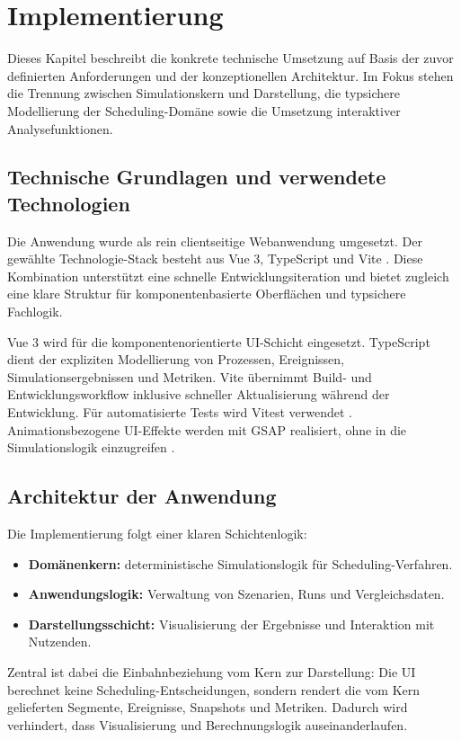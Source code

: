 \chapter{Implementierung}

Dieses Kapitel beschreibt die konkrete technische Umsetzung auf Basis der zuvor definierten Anforderungen und der konzeptionellen Architektur. Im Fokus stehen die Trennung zwischen Simulationskern und Darstellung, die typsichere Modellierung der Scheduling-Domäne sowie die Umsetzung interaktiver Analysefunktionen.

\section{Technische Grundlagen und verwendete Technologien}

Die Anwendung wurde als rein clientseitige Webanwendung umgesetzt. Der gewählte Technologie-Stack besteht aus Vue 3, TypeScript und Vite \cite{vue3,vite}. Diese Kombination unterstützt eine schnelle Entwicklungsiteration und bietet zugleich eine klare Struktur für komponentenbasierte Oberflächen und typsichere Fachlogik.

Vue 3 wird für die komponentenorientierte UI-Schicht eingesetzt. TypeScript dient der expliziten Modellierung von Prozessen, Ereignissen, Simulationsergebnissen und Metriken. Vite übernimmt Build- und Entwicklungsworkflow inklusive schneller Aktualisierung während der Entwicklung. Für automatisierte Tests wird Vitest verwendet \cite{vitest}. Animationsbezogene UI-Effekte werden mit GSAP realisiert, ohne in die Simulationslogik einzugreifen \cite{gsap}.

\section{Architektur der Anwendung}

Die Implementierung folgt einer klaren Schichtenlogik:

\begin{itemize}
  \item \textbf{Domänenkern:} deterministische Simulationslogik für Scheduling-Verfahren.
  \item \textbf{Anwendungslogik:} Verwaltung von Szenarien, Runs und Vergleichsdaten.
  \item \textbf{Darstellungsschicht:} Visualisierung der Ergebnisse und Interaktion mit Nutzenden.
\end{itemize}

Zentral ist dabei die Einbahnbeziehung vom Kern zur Darstellung: Die UI berechnet keine Scheduling-Entscheidungen, sondern rendert die vom Kern gelieferten Segmente, Ereignisse, Snapshots und Metriken. Dadurch wird verhindert, dass Visualisierung und Berechnungslogik auseinanderlaufen.

